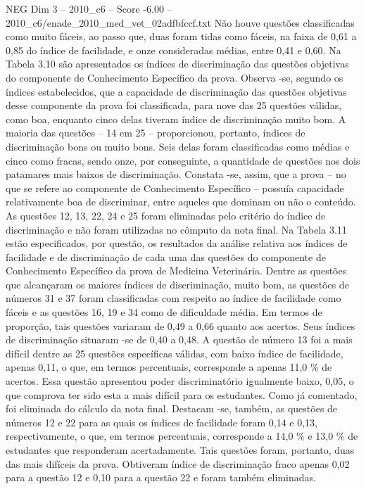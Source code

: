 \begin{textsample}{NEG Dim 3 – 2010\_c6 – Score -6.00 – 2010\_c6/enade\_2010\_med\_vet\_02adfbfccf.txt}
Não houve questões classificadas como muito fáceis, ao passo que, duas foram tidas como fáceis, na faixa de 0,61 a 0,85 do índice de facilidade, e onze consideradas médias, entre 0,41 e 0,60.
Na Tabela 3.10 são apresentados os índices de discriminação das questões objetivas do componente de Conhecimento Específico da prova.
Observa -se, segundo os índices estabelecidos, que a capacidade de discriminação das questões objetivas desse componente da prova foi classificada, para nove das 25 questões válidas, como boa, enquanto cinco delas tiveram índice de discriminação muito bom.
A maioria das questões – 14 em 25 – proporcionou, portanto, índices de discriminação bons ou muito bons.
Seis delas foram classificadas como médias e cinco como fracas, sendo onze, por conseguinte, a quantidade de questões nos dois patamares mais baixos de discriminação.
Constata -se, assim, que a prova – no que se refere ao componente de Conhecimento Específico – possuía capacidade relativamente boa de discriminar, entre aqueles que dominam ou não o conteúdo.
As questões 12, 13, 22, 24 e 25 foram eliminadas pelo critério do índice de discriminação e não foram utilizadas no cômputo da nota final.
Na Tabela 3.11 estão especificados, por questão, os resultados da análise relativa aos índices de facilidade e de discriminação de cada uma das questões do componente de Conhecimento Específico da prova de Medicina Veterinária.
Dentre as questões que alcançaram os maiores índices de discriminação, muito bom, as questões de números 31 e 37 foram classificadas com respeito ao índice de facilidade como fáceis e as questões 16, 19 e 34 como de dificuldade média.
Em termos de proporção, tais questões variaram de 0,49 a 0,66 quanto aos acertos.
Seus índices de discriminação situaram -se de 0,40 a 0,48.
A questão de número 13 foi a mais difícil dentre as 25 questões específicas válidas, com baixo índice de facilidade, apenas 0,11, o que, em termos percentuais, corresponde a apenas 11,0 \% de acertos.
Essa questão apresentou poder discriminatório igualmente baixo, 0,05, o que comprova ter sido esta a mais difícil para os estudantes.
Como já comentado, foi eliminada do cálculo da nota final.
Destacam -se, também, as questões de números 12 e 22 para as quais os índices de facilidade foram 0,14 e 0,13, respectivamente, o que, em termos percentuais, corresponde a 14,0 \% e 13,0 \% de estudantes que responderam acertadamente.
Tais questões foram, portanto, duas das mais difíceis da prova.
Obtiveram índice de discriminação fraco apenas 0,02 para a questão 12 e 0,10 para a questão 22 e foram também eliminadas.

\end{textsample}
